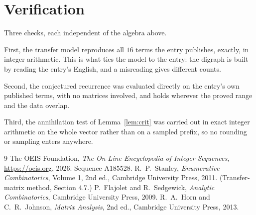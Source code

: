 \documentclass[11pt,a4paper]{article}
\theoremstyle{plain}
\theoremstyle{definition}
\begin{document}
\section{Verification}

Three checks, each independent of the algebra above.

First, the transfer model reproduces all $16$ terms the entry publishes, exactly, in
integer arithmetic. This is what ties the model to the entry: the digraph is built by reading
the entry's English, and a misreading gives different counts.

Second, the conjectured recurrence was evaluated directly on the entry's own published terms,
with no matrices involved, and holds wherever the proved range and the data overlap.

Third, the annihilation test of Lemma~\ref{lem:crit} was carried out in exact integer
arithmetic on the whole vector rather than on a sampled prefix, so no rounding or sampling
enters anywhere.

\begin{thebibliography}{9}
 The OEIS Foundation, \emph{The On-Line Encyclopedia of Integer
Sequences}, \url{https://oeis.org}, 2026. Sequence A185528.
 R.~P.~Stanley, \emph{Enumerative Combinatorics}, Volume 1, 2nd ed.,
Cambridge University Press, 2011. (Transfer-matrix method, Section 4.7.)
 P.~Flajolet and R.~Sedgewick, \emph{Analytic Combinatorics}, Cambridge
University Press, 2009.
 R.~A.~Horn and C.~R.~Johnson, \emph{Matrix Analysis}, 2nd ed., Cambridge
University Press, 2013.
\end{thebibliography}
\end{document}
